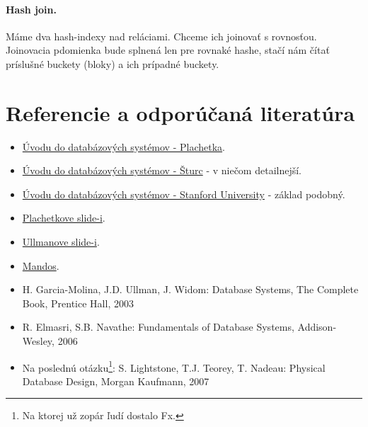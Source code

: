 \documentclass[10pt,a4paper]{article}
\begin{document}
\paragraph{Hash join.}
Máme dva hash-indexy nad reláciami. Chceme ich joinovať s rovnosťou. Joinovacia pdomienka bude splnená len pre rovnaké hashe, stačí nám čítať príslušné buckety (bloky) a ich prípadné buckety. 

\clearpage
\section*{Referencie a odporúčaná literatúra}
\begin{itemize}                                
\item \href{http://www.dcs.fmph.uniba.sk/~plachetk/TEACHING/DB2011/index.html}{Úvodu do databázových systémov - Plachetka}.        
\item \href{http://www.dcs.fmph.uniba.sk/~sturc/databazy/uvod/}{Úvodu do databázových systémov - Šturc} - v niečom detailnejší.        
\item \href{http://infolab.stanford.edu/~widom/cs145/}{Úvodu do databázových systémov - Stanford University} - základ podobný.


\item \href{http://csip.sk/uploads/plachetka\_uvod\_do\_databaz\_2011.pdf}{Plachetkove slide-i}.
\item \href{http://csip.sk/uploads/ullman.pdf}{Ullmanove slide-i}.
\item \href{http://fmfi-uk.hq.sk/Informatika/Uvod\%20Do\%20Databazovych\%20Systemov/prednasky/}{Mandos}.
\item H. Garcia-Molina, J.D. Ullman, J. Widom: Database Systems, The Complete Book, Prentice Hall, 2003
\item R. Elmasri, S.B. Navathe: Fundamentals of Database Systems, Addison-Wesley, 2006
\item Na poslednú otázku\footnote{
Na ktorej už zopár ľudí dostalo Fx.
}: S. Lightstone, T.J. Teorey, T. Nadeau: Physical Database Design, Morgan Kaufmann, 2007
\end{itemize}
\end{document}

